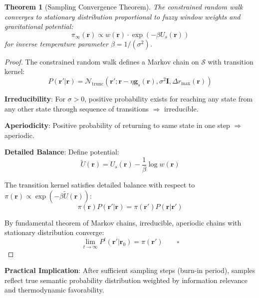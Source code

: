 \documentclass[12pt,a4paper]{article}
\newtheorem{theorem}{Theorem}
\begin{document}
\begin{theorem}[Sampling Convergence Theorem]
The constrained random walk converges to stationary distribution proportional to fuzzy window weights and gravitational potential:
\begin{equation}
\pi_{\infty}(\mathbf{r}) \propto w(\mathbf{r}) \cdot \exp(-\beta U_s(\mathbf{r}))
\end{equation}
for inverse temperature parameter $\beta = 1/(\sigma^2)$.
\end{theorem}

\begin{proof}
The constrained random walk defines a Markov chain on $\mathcal{S}$ with transition kernel:
\begin{equation}
P(\mathbf{r}' | \mathbf{r}) = \mathcal{N}_{\text{trunc}}(\mathbf{r}' ; \mathbf{r} - \eta \mathbf{g}_s(\mathbf{r}), \sigma^2 \mathbf{I}, \Delta r_{\max}(\mathbf{r}))
\end{equation}

\textbf{Irreducibility}: For $\sigma > 0$, positive probability exists for reaching any state from any other state through sequence of transitions $\Rightarrow$ irreducible.

\textbf{Aperiodicity}: Positive probability of returning to same state in one step $\Rightarrow$ aperiodic.

\textbf{Detailed Balance}: Define potential:
\begin{equation}
\tilde{U}(\mathbf{r}) = U_s(\mathbf{r}) - \frac{1}{\beta} \log w(\mathbf{r})
\end{equation}

The transition kernel satisfies detailed balance with respect to $\pi(\mathbf{r}) \propto \exp(-\beta \tilde{U}(\mathbf{r}))$:
\begin{equation}
\pi(\mathbf{r}) P(\mathbf{r}' | \mathbf{r}) = \pi(\mathbf{r}') P(\mathbf{r} | \mathbf{r}')
\end{equation}

By fundamental theorem of Markov chains, irreducible, aperiodic chains with stationary distribution converge:
\begin{equation}
\lim_{t \to \infty} P^t(\mathbf{r}' | \mathbf{r}_0) = \pi(\mathbf{r}') \qquad \square
\end{equation}
\end{proof}

\textbf{Practical Implication}: After sufficient sampling steps (burn-in period), samples reflect true semantic probability distribution weighted by information relevance and thermodynamic favorability.
\end{document}
